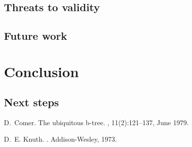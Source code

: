 \documentclass[a4paper]{article}
\begin{document}
\subsection{Threats to validity}
\subsection{Future work}


\section{Conclusion}

\subsection{Next steps}




%
%

\begin{thebibliography}{Com79}

  D.~Comer.
  \newblock The ubiquitous b-tree.
  , 11(2):121--137, June 1979.

  D.~E. Knuth.
  .
  \newblock Addison-Wesley, 1973.

\end{thebibliography}
\end{document}
